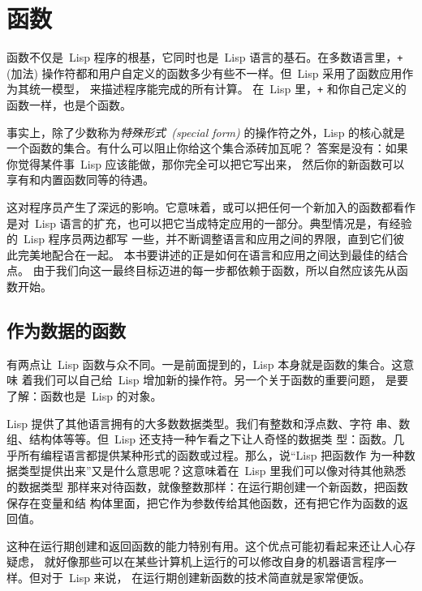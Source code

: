 
\chapter{函数}
\label{chap:functions}

函数不仅是~Lisp 程序的根基，它同时也是~Lisp 语言的基石。在多数语言里，\verb|+| (加法)
操作符都和用户自定义的函数多少有些不一样。但~Lisp 采用了函数应用作为其统一模型，
来描述程序能完成的所有计算。
在~Lisp 里，\verb|+| 和你自己定义的函数一样，也是个函数。

事实上，除了少数称为\emph{特殊形式~(special form)}
的操作符之外，Lisp 的核心就是一个函数的集合。有什么可以阻止你给这个集合添砖加瓦呢？
答案是没有：如果你觉得某件事~Lisp 应该能做，那你完全可以把它写出来，
然后你的新函数可以享有和内置函数同等的待遇。

这对程序员产生了深远的影响。它意味着，或可以把任何一个新加入的函数都看作是对~Lisp
语言的扩充，也可以把它当成特定应用的一部分。典型情况是，有经验的~Lisp 程序员两边都写
一些，并不断调整语言和应用之间的界限，直到它们彼此完美地配合在一起。
本书要讲述的正是如何在语言和应用之间达到最佳的结合点。
由于我们向这一最终目标迈进的每一步都依赖于函数，所以自然应该先从函数开始。

\section{作为数据的函数}
\label{sec:functions_as_data}

有两点让~Lisp 函数与众不同。一是前面提到的，Lisp 本身就是函数的集合。这意味
着我们可以自己给~Lisp 增加新的操作符。另一个关于函数的重要问题，
是要了解：函数也是~Lisp 的对象。

Lisp 提供了其他语言拥有的大多数数据类型。我们有整数和浮点数、字符
串、数组、结构体等等。但~Lisp 还支持一种乍看之下让人奇怪的数据类
型：函数。几乎所有编程语言都提供某种形式的函数或过程。那么，说``Lisp 把函数作
为一种数据类型提供出来''又是什么意思呢？这意味着在~Lisp 里我们可以像对待其他熟悉的数据类型
那样来对待函数，就像整数那样：在运行期创建一个新函数，把函数保存在变量和结
构体里面，把它作为参数传给其他函数，还有把它作为函数的返回值。

这种在运行期创建和返回函数的能力特别有用。这个优点可能初看起来还让人心存疑虑，
就好像那些可以在某些计算机上运行的可以修改自身的机器语言程序一样。但对于~Lisp 来说，
在运行期创建新函数的技术简直就是家常便饭。


